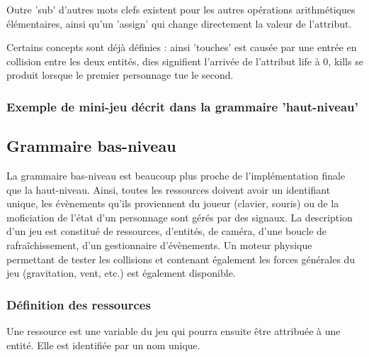 Outre 'sub' d'autres mots clefs existent pour les autres opérations arithmétiques élémentaires, ainsi qu'un 'assign' qui change directement
la valeur de l'attribut.

Certains concepts sont déjà définies : ainsi 'touches' est causée par une entrée en collision entre les deux entités, dies signifient l'arrivée de l'attribut
life à 0, kills se produit lorsque le premier personnage tue le second.

\subsubsection{Exemple de mini-jeu décrit dans la grammaire 'haut-niveau'}


\subsection{Grammaire bas-niveau}

La grammaire bas-niveau est beaucoup plus proche de l'implémentation finale que la haut-niveau.
Ainsi, toutes les ressources doivent avoir un identifiant unique, les évènements qu'ils proviennent du joueur (clavier, souris) ou de la moficiation
de l'état d'un personnage sont gérés par des signaux.
La description d'un jeu est constitué de ressources, d'entités, de caméra, d'une boucle de rafraîchissement, d'un gestionnaire d'évènements.
Un moteur physique permettant de tester les collisions et contenant également les forces générales du jeu (gravitation, vent, etc.) est également disponible.

\subsubsection{Définition des ressources}

Une ressource est une variable du jeu qui pourra ensuite être attribuée à une entité.
Elle est identifiée par un nom unique.

